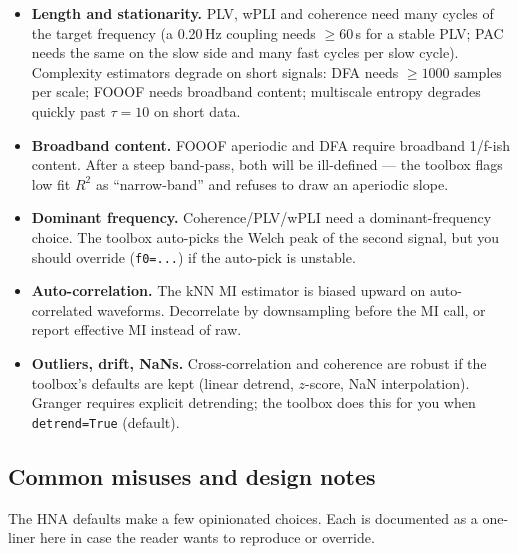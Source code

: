 \documentclass[11pt,a4paper]{article}
\begin{document}
\begin{itemize}
  \item \textbf{Length and stationarity.} PLV, wPLI and coherence need
        many cycles of the target frequency (a 0.20\,Hz coupling needs
        $\geq 60$\,s for a stable PLV; PAC needs the same on the slow
        side and many fast cycles per slow cycle). Complexity
        estimators degrade on short signals: DFA needs $\geq 1000$
        samples per scale; FOOOF needs broadband content; multiscale
        entropy degrades quickly past $\tau\!=\!10$ on short data.
  \item \textbf{Broadband content.} FOOOF aperiodic and DFA require
        broadband 1/f-ish content. After a steep band-pass, both will
        be ill-defined --- the toolbox flags low fit
        $R^2$ as ``narrow-band'' and refuses to draw an aperiodic
        slope.
  \item \textbf{Dominant frequency.} Coherence/PLV/wPLI need a
        dominant-frequency choice. The toolbox auto-picks the Welch peak
        of the second signal, but you should override
        (\texttt{f0=...}) if the auto-pick is unstable.
  \item \textbf{Auto-correlation.} The kNN MI estimator is biased
        upward on auto-correlated waveforms. Decorrelate by
        downsampling before the MI call, or report effective MI
        instead of raw.
  \item \textbf{Outliers, drift, NaNs.} Cross-correlation and
        coherence are robust if the toolbox's defaults are kept (linear
        detrend, $z$-score, NaN interpolation). Granger requires
        explicit detrending; the toolbox does this for you when
        \texttt{detrend=True} (default).
\end{itemize}

\subsection{Common misuses and design notes}

The HNA defaults make a few opinionated choices. Each is documented as
a one-liner here in case the reader wants to reproduce or override.
\end{document}
